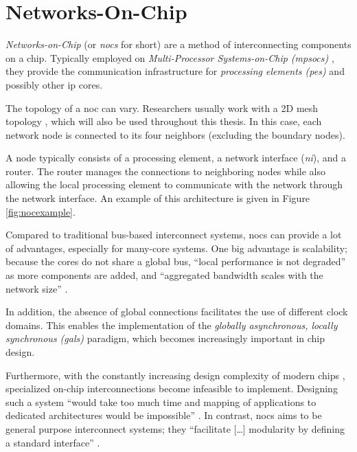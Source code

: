 \section{Networks-On-Chip}\label{sec:networkonchipfun}
\textit{Networks-on-Chip} (or \textit{\glspl{noc}} for short) are a method of interconnecting components on a chip. Typically employed on
\textit{Multi-Processor Systems-on-Chip (\glspl{mpsoc})} \cites(e.g.)(){ivanov05nocintroduction}{biswas15routerattack}{tatas16designingnocs}, they
provide the communication infrastructure for \textit{processing elements (\glspl{pe})} and possibly other \gls{ip} cores.

The topology of a \gls{noc} can vary. Researchers usually work with a 2D mesh topology
\cites(e.g.)(){frey17hardenednoc}{kumar02networkonchip}{fernandes16nocrouting}{boraten16packetsecurity}, which will also be used throughout this thesis.
In this case, each network node is connected to its four neighbors (excluding the boundary nodes).

A node typically consists of a processing element, a network interface (\textit{\gls{ni}}), and a router. \cite{dally01routepacketsnotwires} The
router manages the connections to neighboring nodes while also allowing the local processing element to communicate with the network through the
network interface. An example of this architecture is given in Figure \vref{fig:nocexample}.

Compared to traditional bus-based interconnect systems, \glspl{noc} can provide a lot of advantages, especially for many-core systems.
\cite[5\psqq]{tatas16designingnocs} One big advantage is scalability; because the cores do not share a global bus, \enquote{local performance is not
degraded} \cite[6]{tatas16designingnocs} as more components are added, and \enquote{aggregated bandwidth scales with the network size}
\cite[6]{tatas16designingnocs}.

In addition, the absence of global connections facilitates the use of different clock domains. This enables the implementation of the
\textit{globally asynchronous, locally synchronous (\gls{gals})} paradigm, which becomes increasingly important in chip design.
\cites[3]{kumar02networkonchip}[2]{ivanov05nocintroduction}

Furthermore, with the constantly increasing design complexity of modern chips \cite{mack11mooreslaw}, specialized on-chip
interconnections become infeasible to implement. Designing such a system \enquote{would take too much time and mapping of applications to dedicated
architectures would be impossible} \cite[1]{kumar02networkonchip}. In contrast, \glspl{noc} aims to be general purpose interconnect systems; they
\enquote{facilitate […] modularity by defining a standard interface} \cite[1]{dally01routepacketsnotwires}.

